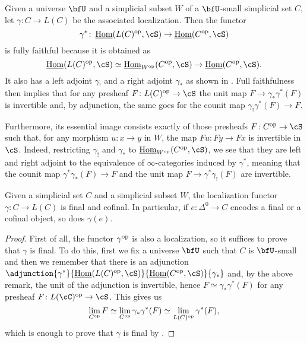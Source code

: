 \begin{rmk}

  Given a universe $\bfU$ and a simplicial subset $W$ of a $\bfU$-small
  simplicial set $C$, let $\gamma\colon C\rightarrow L(C)$ be the
  associated localization. Then the functor
  $$\gamma^*\colon\home(L(C)^{\op},\cS)\rightarrow\home(C^{\op},\cS)$$ is
  fully faithful because it is obtained as
  \[\home(L(C)^{\op},\cS)\simeq\home_{W^{\op}}(C^{\op},\cS)\rightarrow\home(C^{\op},\cS).\]
  It also has a left adjoint $\gamma_!$ and a right adjoint $\gamma_*$ as
  shown in \cite[Ch.\ 6]{Cis19}. Full faithfulness then implies that for any
  presheaf $F\colon L(C)^{\op}\rightarrow\cS$ the unit map
  $F\rightarrow\gamma_*\gamma^*(F)$ is invertible and, by adjunction, the same
  goes for the counit map $\gamma_!\gamma^*(F)\rightarrow F$.

  \noindent
  Furthermore, its essential image consists exactly of those presheafs $F\colon
  C^{\op}\rightarrow\cS$ such that, for any morphism $u\colon x\rightarrow y$ in
  $W$, the map $Fu\colon Fy\rightarrow Fx$ is invertible in $\cS$. Indeed,
  restricting
  $\gamma_!$ and $\gamma_*$ to $\home_{W^{\op}}(C^{\op},\cS)$, we see that they
  are left and right adjoint to the equivalence of $\infty$-categories induced
  by $\gamma^*$, meaning that the counit map $\gamma^*\gamma_*(F)\rightarrow F$
  and the unit map $F\rightarrow\gamma^*\gamma_!(F)$ are invertible.
\end{rmk}

\begin{prop}\label{7110}
  Given a simplicial set $C$ and a simplicial subset $W$, the localization
  functor $\gamma\colon C\rightarrow L(C)$ is final and cofinal. In
  particular, if $e\colon\Delta^0\rightarrow C$ encodes a final or a cofinal
  object, so does $\gamma(e)$.
\end{prop}
\begin{proof}
  First of all, the functor $\gamma^{\operatorname{op}}$ is also a localization, so it
  suffices to prove that $\gamma$ is final. To do this, first we fix a universe
  $\bfU$ such that $C$ is $\bfU$-small and then we remember that there
  is an adjunction
  $\adjunction{\gamma^*}{\home(L(C)^{\op},\cS)}{\home(C^{\op},\cS)}{\gamma_*}$
  and, by the above remark, the unit of the adjunction is invertible, hence
  $F\simeq\gamma_*\gamma^*(F)$ for any presheaf $F\colon
  L(\cC)^{\op}\rightarrow\cS$. This gives us
  \[\lim_{C^{\operatorname{op}}}F\simeq
  \lim_{C^{\operatorname{op}}}\gamma_*\gamma^*(F)\simeq
  \lim_{L(C)^{\operatorname{op}}}\gamma^*(F),\]
  which is enough to prove that $\gamma$ is final by \cite[Thm.\ 6.4.5]{Cis19}.
\end{proof}

